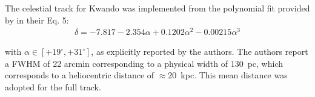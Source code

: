 The celestial track for Kwando was implemented from the polynomial fit provided by \citet{Grillmair2017_south} in their Eq. 5:
\begin{eqnarray*}
\delta = -7.817 -2.354\alpha +0.1202\alpha^2 -0.00215\alpha^3 
\end{eqnarray*}

with $\alpha \in [+19^\circ,+31^\circ]$, as explicitly reported by the authors. The authors report a FWHM of 22 arcmin corresponding to a physical width of 130~pc, which corresponds to a heliocentric distance of $\approx$20~kpc. This mean distance was adopted for the full track.
